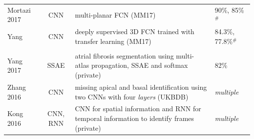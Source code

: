 \documentclass[journal]{IEEEtran}
\begin{document}
\begin{table}[!t]
\begin{minipage}{\textwidth}
\begin{tabularx}{\textwidth}{l c l l}
			Mortazi 2017\cite{mortazi2017multi}        & CNN            & multi-planar FCN (MM17)                                                                   & 90\%, 85\%$^\#$                                                                                                                                                                                                                                     \\
			Yang\cite{yang2017hybrid}                  & CNN            & deeply supervised 3D FCN trained with transfer learning (MM17)                            & 84.3\%, 77.8\%$^\#$                                                                                                                                                                                                                                 \\
			\midrule
			\multicolumn{4}{l}{\thead{Others applications}}                                                                                                                                                                                                                                                                                                                                                          \\
			\midrule
			Yang 2017\cite{yang2017segmenting}         & SSAE           & atrial fibrosis segmentation using multi-atlas propagation, SSAE and softmax (private)    & 82\%                                                                                                                                                                                                                                           \\
			Zhang 2016\cite{zhang2016automated}        & CNN            & missing apical and basal identification using two CNNs with four \textit{layers} (UKBDB)  & \textit{multiple}                                                                                                                                                                                                                                       \\
			Kong 2016\cite{kong2016recognizing}        & CNN, RNN       & CNN for spatial information and RNN for temporal information to identify frames (private) & \textit{multiple}                                                                                                                                                                                                                                  \\

\end{tabularx}
\end{minipage}
\end{table}
\end{document}
